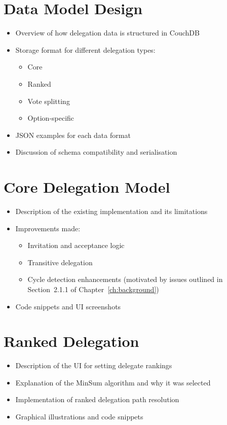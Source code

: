 \section{Data Model Design}
\begin{itemize}
  \item Overview of how delegation data is structured in CouchDB
  \item Storage format for different delegation types:
  \begin{itemize}
    \item Core
    \item Ranked
    \item Vote splitting
    \item Option-specific
  \end{itemize}
  \item JSON examples for each data format
  \item Discussion of schema compatibility and serialisation
\end{itemize}

\section{Core Delegation Model}
\begin{itemize}
  \item Description of the existing implementation and its limitations
  \item Improvements made:
  \begin{itemize}
    \item Invitation and acceptance logic
    \item Transitive delegation
    \item Cycle detection enhancements (motivated by issues outlined in Section~2.1.1 of Chapter~\ref{ch:background})
  \end{itemize}
  \item Code snippets and UI screenshots
\end{itemize}

\section{Ranked Delegation}
\begin{itemize}
  \item Description of the UI for setting delegate rankings
  \item Explanation of the MinSum algorithm and why it was selected
  \item Implementation of ranked delegation path resolution
  \item Graphical illustrations and code snippets
\end{itemize}


